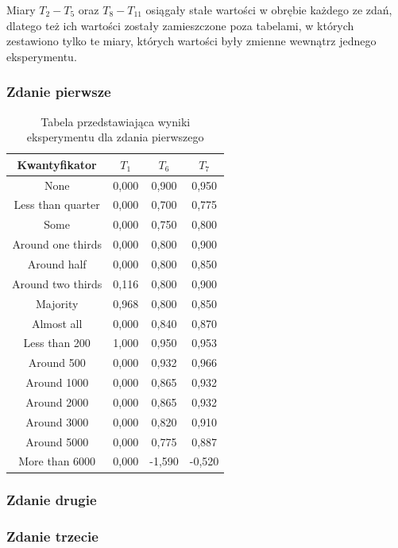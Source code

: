 \documentclass{classrep}
\begin{document}
Miary $T_2 - T_5$ oraz $T_8 - T_{11}$ osiągały stałe wartości w obrębie każdego ze zdań, dlatego też ich wartości zostały zamieszczone poza tabelami, w których zestawiono tylko te miary, których wartości były zmienne wewnątrz jednego eksperymentu.

\subsubsection{Zdanie pierwsze}

\begin{table}[H]
	\centering
	\begin{tabular}{c c c c} 
		\hline
		\textbf{Kwantyfikator}  & \textbf{$T_1$} & \textbf{$T_6$} & \textbf{$T_7$}\\ [0.5ex] 
		\hline
None	&	0,000	&	0,900	&	0,950	\\
Less than quarter	&	0,000	&	0,700	&	0,775	\\
Some 	&	0,000	&	0,750	&	0,800	\\
Around one thirds 	&	0,000	&	0,800	&	0,900	\\
Around half 	&	0,000	&	0,800	&	0,850	\\
Around two thirds 	&	0,116	&	0,800	&	0,900	\\
Majority 	&	0,968	&	0,800	&	0,850	\\
Almost all	&	0,000	&	0,840	&	0,870	\\
Less than 200	&	1,000	&	0,950	&	0,953	\\
Around 500	&	0,000	&	0,932	&	0,966	\\
Around 1000	&	0,000	&	0,865	&	0,932	\\
Around 2000	&	0,000	&	0,865	&	0,932	\\
Around 3000	&	0,000	&	0,820	&	0,910	\\
Around 5000	&	0,000	&	0,775	&	0,887	\\
More than 6000	&	0,000	&	-1,590	&	-0,520	\\
		\hline
	\end{tabular}
	\caption{Tabela przedstawiająca wyniki eksperymentu dla zdania pierwszego}
\end{table}

\subsubsection{Zdanie drugie}

\subsubsection{Zdanie trzecie}
\end{document}
